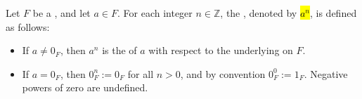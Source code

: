 \begin{definition} \label{definition:exponentiation_in_a_field}
    Let $F$ be a , and let $a \in F$. For each integer $n \in \mathbb{Z}$, the , denoted by \hl{$a^n$}, is defined as follows:
    \begin{itemize}
        \item If $a \neq 0_F$, then $a^n$ is the  of $a$ with respect to the underlying  on $F$.
        \item If $a = 0_F$, then $0_F^n := 0_F$ for all $n > 0$, and by convention $0_F^0 := 1_F$. Negative powers of zero are undefined.
    \end{itemize}
\end{definition}

